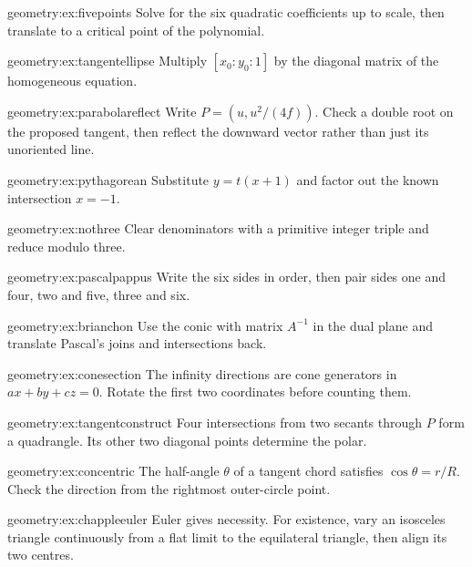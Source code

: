 \begin{hint}{geometry:ex:fivepoints}
Solve for the six quadratic coefficients up to scale, then translate to a critical point of the polynomial.
\end{hint}
\begin{hint}{geometry:ex:tangentellipse}
Multiply $[x_0:y_0:1]$ by the diagonal matrix of the homogeneous equation.
\end{hint}
\begin{hint}{geometry:ex:parabolareflect}
Write $P=(u,u^2/(4f))$. Check a double root on the proposed tangent, then reflect the downward vector rather than just its unoriented line.
\end{hint}
\begin{hint}{geometry:ex:pythagorean}
Substitute $y=t(x+1)$ and factor out the known intersection $x=-1$.
\end{hint}
\begin{hint}{geometry:ex:nothree}
Clear denominators with a primitive integer triple and reduce modulo three.
\end{hint}
\begin{hint}{geometry:ex:pascalpappus}
Write the six sides in order, then pair sides one and four, two and five, three and six.
\end{hint}
\begin{hint}{geometry:ex:brianchon}
Use the conic with matrix $A^{-1}$ in the dual plane and translate Pascal's joins and intersections back.
\end{hint}
\begin{hint}{geometry:ex:conesection}
The infinity directions are cone generators in $ax+by+cz=0$. Rotate the first two coordinates before counting them.
\end{hint}
\begin{hint}{geometry:ex:tangentconstruct}
Four intersections from two secants through $P$ form a quadrangle. Its other two diagonal points determine the polar.
\end{hint}
\begin{hint}{geometry:ex:concentric}
The half-angle $\theta$ of a tangent chord satisfies $\cos\theta=r/R$. Check the direction from the rightmost outer-circle point.
\end{hint}
\begin{hint}{geometry:ex:chappleeuler}
Euler gives necessity. For existence, vary an isosceles triangle continuously from a flat limit to the equilateral triangle, then align its two centres.
\end{hint}
